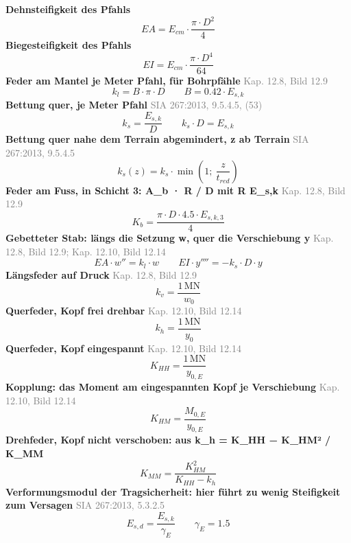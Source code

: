 \documentclass[11pt,a4paper]{article}
\newcommand{\normref}[1]{{\small\textcolor{gray}{#1}}}
\begin{document}
\noindent\textbf{Dehnsteifigkeit des Pfahls}
\begin{equation*}
EA = E_{cm} \cdot \frac{\pi \cdot D^{2}}{4}
\end{equation*}
\noindent\textbf{Biegesteifigkeit des Pfahls}
\begin{equation*}
EI = E_{cm} \cdot \frac{\pi \cdot D^{4}}{64}
\end{equation*}
\noindent\textbf{Feder am Mantel je Meter Pfahl, für Bohrpfähle} \hfill \normref{Kap. 12.8, Bild 12.9}
\begin{equation*}
k_l = B \cdot \pi \cdot D \qquad B = 0.42 \cdot E_{s,k}
\end{equation*}
\noindent\textbf{Bettung quer, je Meter Pfahl} \hfill \normref{SIA 267:2013, 9.5.4.5, (53)}
\begin{equation*}
k_s = \frac{E_{s,k}}{D} \qquad k_s \cdot D = E_{s,k}
\end{equation*}
\noindent\textbf{Bettung quer nahe dem Terrain abgemindert, z ab Terrain} \hfill \normref{SIA 267:2013, 9.5.4.5}
\begin{equation*}
k_s(z) = k_s \cdot \min\left(1;\ \frac{z}{t_{red}}\right)
\end{equation*}
\noindent\textbf{Feder am Fuss, in Schicht 3: A\_b · R / D mit R E\_s,k} \hfill \normref{Kap. 12.8, Bild 12.9}
\begin{equation*}
K_b = \frac{\pi \cdot D \cdot 4.5 \cdot E_{s,k,3}}{4}
\end{equation*}
\noindent\textbf{Gebetteter Stab: längs die Setzung w, quer die Verschiebung y} \hfill \normref{Kap. 12.8, Bild 12.9; Kap. 12.10, Bild 12.14}
\begin{equation*}
EA \cdot w'' = k_l \cdot w \qquad EI \cdot y'''' = -k_s \cdot D \cdot y
\end{equation*}
\noindent\textbf{Längsfeder auf Druck} \hfill \normref{Kap. 12.8, Bild 12.9}
\begin{equation*}
k_v = \frac{1\,\mathrm{MN}}{w_0}
\end{equation*}
\noindent\textbf{Querfeder, Kopf frei drehbar} \hfill \normref{Kap. 12.10, Bild 12.14}
\begin{equation*}
k_h = \frac{1\,\mathrm{MN}}{y_0}
\end{equation*}
\noindent\textbf{Querfeder, Kopf eingespannt} \hfill \normref{Kap. 12.10, Bild 12.14}
\begin{equation*}
K_{HH} = \frac{1\,\mathrm{MN}}{y_{0,E}}
\end{equation*}
\noindent\textbf{Kopplung: das Moment am eingespannten Kopf je Verschiebung} \hfill \normref{Kap. 12.10, Bild 12.14}
\begin{equation*}
K_{HM} = \frac{M_{0,E}}{y_{0,E}}
\end{equation*}
\noindent\textbf{Drehfeder, Kopf nicht verschoben: aus k\_h = K\_HH − K\_HM² / K\_MM}
\begin{equation*}
K_{MM} = \frac{K_{HM}^{2}}{K_{HH} - k_h}
\end{equation*}
\noindent\textbf{Verformungsmodul der Tragsicherheit: hier führt zu wenig Steifigkeit zum Versagen} \hfill \normref{SIA 267:2013, 5.3.2.5}
\begin{equation*}
E_{s,d} = \frac{E_{s,k}}{\gamma_E} \qquad \gamma_E = 1.5
\end{equation*}
\end{document}
